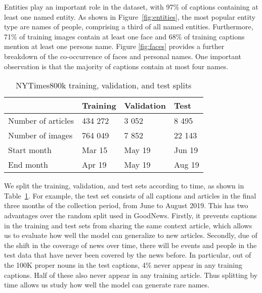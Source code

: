 Entities play an important role in the dataset, with 97\% of captions
containing at least one named entity. As shown in Figure~\ref{fig:entities},
the most popular entity type are names of people, comprising a third of all
named entities. Furthermore, 71\% of training images contain at least one face
and 68\% of training captions mention at least one persons name. Figure
\ref{fig:faces} provides a further breakdown of the co-occurrence of faces and
personal names. One important observation is that the majority of captions
contain at most four names.


\begin{table}[t]
	\caption {NYTimes800k training, validation, and test splits}
	\label{tab:splits}
	\centering
	\begin{tabularx}{\linewidth}{lXXX}
		\toprule
		  & Training  &   Validation & Test \\
		\midrule
      Number of articles & 434 272 & 3 052 & 8 495 \\
      Number of images  & 764 049 & 7 852 & 22 143 \\
      Start month & Mar 15 & May 19 & Jun 19 \\
      End month & Apr 19 & May 19 & Aug 19 \\
		\bottomrule
	\end{tabularx}
\end{table}

We split the training, validation, and test sets according to time, as shown in
Table~\ref{tab:splits}. For example, the test set consists of all captions and
articles in the final three months of the collection period, from June to
August 2019. This has two advantages over the random split used in GoodNews.
Firstly, it prevents captions in the training and test sets from sharing the
same context article, which allows us to evaluate how well the model can
generalize to new articles. Secondly, due of the shift in the coverage of news
over time, there
will be events and people in the test data that have never been covered by the
news
before. In particular, out of the 100K proper nouns in the test captions, 4\%
never appear in any training captions. Half of these also never appear in any
training article. Thus splitting by time allows us study how well the model can
generate rare names.
